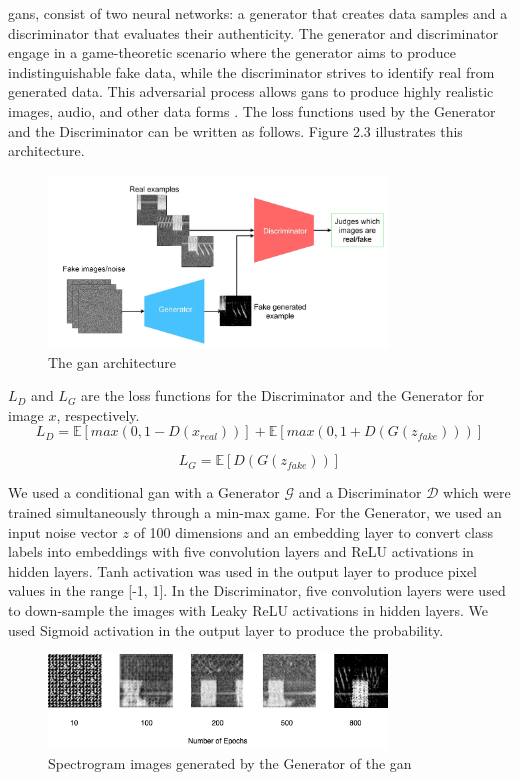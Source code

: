 \gls{gan}s, consist of two neural networks: a generator that creates data samples and a discriminator that evaluates their authenticity. The generator and discriminator engage in a game-theoretic scenario where the generator aims to produce indistinguishable fake data, while the discriminator strives to identify real from generated data. This adversarial process allows \gls{gan}s to produce highly realistic images, audio, and other data forms \cite{10}. The loss functions used by the Generator and the Discriminator can be written as follows. Figure 2.3 illustrates this architecture.
\begin{figure}[h]
\includegraphics[width=9cm]{figures/gan.png}
\centering
\caption{The \gls{gan} architecture  }
\centering
\end{figure} 
 $L_D$ and $L_G$ are the loss functions for the Discriminator and the Generator for image $x$, respectively.
\begin{equation}
    L_D=\mathbb{E}[max(0,1 - D(x_{real}))]+\mathbb{E}[max(0,1+D(G(z_{fake})))]
\end{equation}

\begin{equation}
    L_G=\mathbb{E}[D(G(z_{fake}))]
\end{equation}

We used a conditional \gls{gan} with a Generator $\mathcal{G}$ and a Discriminator $\mathcal{D}$ which were trained simultaneously through a min-max game. For the Generator, we used an input noise vector $z$ of 100 dimensions and an embedding layer to convert class labels into embeddings with five convolution layers and ReLU activations in hidden layers. Tanh activation was used in the output layer to produce pixel values in the range [-1, 1]. In the Discriminator, five convolution layers were used to down-sample the images with Leaky ReLU activations in hidden layers. We used Sigmoid activation in the output layer to produce the probability.
\begin{figure}[h]
\includegraphics[width=9cm]{figures/gan training.drawio (1).png}
\centering
\caption{Spectrogram images generated by the Generator of the \gls{gan}}
\centering
\end{figure}

